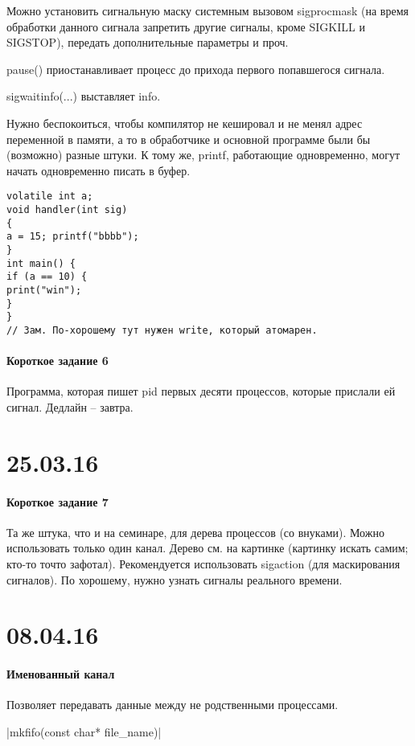 \documentclass[a4paper,10pt]{article}
\newcommand{\cl}{\mint{c}}
\begin{document}
Можно установить сигнальную маску системным вызовом sigprocmask (на время обработки данного сигнала запретить другие сигналы, кроме SIGKILL и SIGSTOP), передать дополнительные параметры и проч.

pause() приостанавливает процесс до прихода первого попавшегося сигнала.

sigwaitinfo(...) выставляет info.

Нужно беспокоиться, чтобы компилятор не кешировал и не менял адрес переменной в памяти, а то в обработчике и основной программе были бы (возможно) разные штуки. К тому же, printf, работающие одновременно, могут начать одновременно писать в буфер.

\begin{verbatim}
volatile int a; 
void handler(int sig)
{
a = 15; printf("bbbb"); 
}
int main() {
if (a == 10) {
print("win");
}
}
// Зам. По-хорошему тут нужен write, который атомарен.
\end{verbatim}

\paragraph{Короткое задание 6}
Программа, которая пишет pid первых десяти процессов, которые прислали ей сигнал. Дедлайн -- завтра.

\section{25.03.16}
\paragraph{Короткое задание 7}
Та же штука, что и на семинаре, для дерева процессов (со внуками). Можно использовать только один канал. Дерево см. на картинке (картинку искать самим; кто-то точто зафотал).
Рекомендуется использовать sigaction (для маскирования сигналов). По хорошему, нужно узнать сигналы реального времени.

\section{08.04.16}
\paragraph{Именованный канал}
Позволяет передавать данные между не родственными процессами.

\cl|mkfifo(const char* file_name)|
\end{document}

